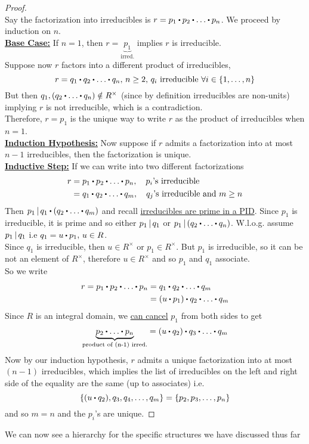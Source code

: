 \documentclass[../Main.tex]{subfiles}
\begin{document}
\begin{proof}~\\
	Say the factorization into irreducibles is $r=p_1\rdot p_2\rdot \dots\rdot p_n$. We proceed by induction on $n$.\\
	\textbf{\underline{Base Case:}} If $n=1$, then $r=\underbrace{p_1}_{\text{irred.}}$ implies $r$ is irreducible.\\
	Suppose now $r$ factors into a different product of irreducibles,
	\[r=q_1\rdot q_2\rdot \dots\rdot q_n,\, n\ge 2,\, q_i \text{ irreducible } \forall i\in \{1,\dots,n\}\]
	But then $q_1,(q_2\rdot \dots\rdot  q_n) \notin R^\times$ (since by definition irreducibles are non-units) implying $r$ is not irreducible, which is a contradiction.\\
	Therefore, $r=p_1$ is the unique way to write $r$ as the product of irreducibles when $n=1$.\\
	\textbf{\underline{Induction Hypothesis:}} Now suppose if $r$ admits a factorization into at most $n-1$ irreducibles, then the factorization is unique.\\
	\textbf{\underline{Inductive Step:}} If we can write into two different factorizations
	\begin{align*}
	r&=p_1\rdot p_2\rdot \dots \rdot p_n, \quad p_i\text{'s irreducible}\\
	&=q_1\rdot q_2\rdot \dots\rdot q_m,\quad q_j\text{'s irreducible and } m\ge n
	\end{align*}
	Then $\divs{p_1}{q_1 \rdot (q_2\rdot \dots\rdot  q_m)}$ and recall \hyperref[prop:11.3]{irreducibles are prime in a PID}. Since $p_1$ is irreducible, it is prime and so either $p_1 \, | \, q_1$ or $\divs{p_1}{(q_2\rdot \dots\rdot  q_n)}$. W.l.o.g. assume $p_1 \, | \, q_1$ i.e $q_1=u\rdot p_1,\, u\in R$.\\
	Since $q_1$ is irreducible, then $u\in R^\times $ or $p_1 \in R^\times$. But $p_1$ is irreducible, so it can be not an element of $R^\times$, therefore $u\in R^\times$ and so $p_1$ and $q_1$ associate.\\
	So we write
	\begin{align*}r=p_1\rdot p_2\rdot \dots \rdot p_n&= q_1\rdot q_2 \rdot  \dots \rdot q_m\\
	&=(u\rdot p_1)\rdot q_2\rdot \dots \rdot q_m \end{align*}
	Since $R$ is an integral domain, we \hyperref[prop:cancel]{can cancel} $p_1$ from both sides to get
	\[\underbrace{p_2\rdot \dots \rdot p_n}_{\text{product of (n-1) irred.}} =(u\rdot q_2)\rdot q_3\rdot \dots \rdot q_m \]
	Now by our induction hypothesis, $r$ admits a unique factorization into at most $(n-1)$ irreducibles, which implies the list of irreducibles on the left and right side of the equality are the same (up to associates) i.e.
	\[\{(u\rdot q_2),q_3,q_4,\dots,q_m\}=\{p_2,p_3,\dots,p_n\}\]
	and so $m=n$ and the $p_i$'s are unique.
\end{proof}
We can now see a hierarchy for the specific structures we have discussed thus far
\end{document}
